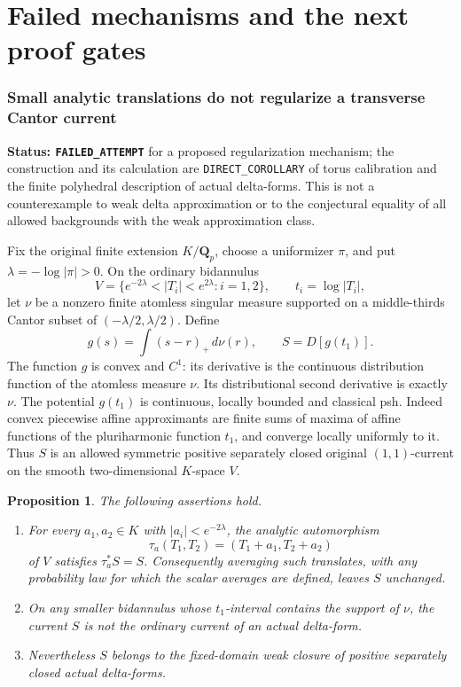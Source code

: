 \documentclass[11pt,a4paper]{article}
\numberwithin{equation}{section}
\newtheorem{proposition}[theorem]{Proposition}
\theoremstyle{definition}
\theoremstyle{remark}
\begin{document}


\part{Failed mechanisms and the next proof gates}

\section[Small analytic translations and transverse Cantor currents]{Small analytic translations do not regularize a transverse Cantor current}
\label{sec:r6-translation-smoothing-obstruction}

\noindent\textbf{Status: \texttt{FAILED\_ATTEMPT}} for a proposed
regularization mechanism; the construction and its calculation are
\texttt{DIRECT\_COROLLARY} of torus calibration and the finite
polyhedral description of actual delta-forms. This is not a counterexample
to weak delta approximation or to the conjectural equality of all allowed
backgrounds with the weak approximation class.

Fix the original finite extension $K/\mathbf Q_p$, choose a uniformizer
$\pi$, and put $\lambda=-\log|\pi|>0$. On the ordinary bidannulus
\[
 V=\{e^{-2\lambda}<|T_i|<e^{2\lambda}:i=1,2\},
 \qquad t_i=\log|T_i|,
\]
let $\nu$ be a nonzero finite atomless singular measure supported on a
middle-thirds Cantor subset of $(-\lambda/2,\lambda/2)$. Define
\[
             g(s)=\int(s-r)_+\,d\nu(r),\qquad
             S=D[g(t_1)].
\]
The function $g$ is convex and $C^1$: its derivative is the continuous
distribution function of the atomless measure $\nu$. Its distributional
second derivative is exactly $\nu$. The potential $g(t_1)$ is continuous,
locally bounded and classical psh. Indeed convex piecewise affine
approximants are finite sums of maxima of affine functions of the
pluriharmonic function $t_1$, and converge locally uniformly to it.
Thus $S$ is an allowed symmetric positive separately closed original
$(1,1)$-current on the smooth two-dimensional $K$-space $V$.

\begin{proposition}
The following assertions hold.
\begin{enumerate}
\item For every $a_1,a_2\in K$ with $|a_i|<e^{-2\lambda}$, the
analytic automorphism
\[
             \tau_a(T_1,T_2)=(T_1+a_1,T_2+a_2)
\]
of $V$ satisfies $\tau_a^*S=S$. Consequently averaging such translates,
with any probability law for which the scalar averages are defined,
leaves $S$ unchanged.
\item On any smaller bidannulus whose $t_1$-interval contains the support
of $\nu$, the current $S$ is not the ordinary current of an actual
delta-form.
\item Nevertheless $S$ belongs to the fixed-domain weak closure of
positive separately closed actual delta-forms.
\end{enumerate}
\end{proposition}
\end{document}
